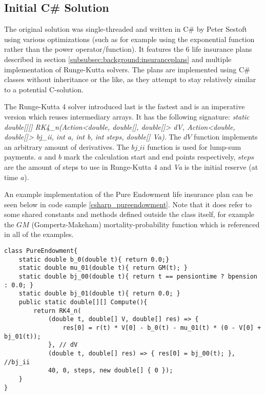 \subsection{Initial C\# Solution}
The original solution was single-threaded and written in C\# by Peter Sestoft using various optimizations (such as for example using the exponential function rather than the power operator/function).
It features the 6 life insurance plans described in section \ref{subsubsec:background:insuranceplans} and multiple implementation of Runge-Kutta solvers.
The plans are implemented using C\# classes without inheritance or the like, as they attempt to stay relatively similar to a potential C-solution.

The Runge-Kutta 4 solver introduced last is the fastest and is an imperative version which reuses intermediary arrays.
It has the following signature: \textit{static double[][] RK4\_n(Action\textless{}double, double[], double[]\textgreater{} dV, Action\textless{}double, double[]\textgreater{} bj\_ii, int a, int b, int steps, double[] Va)}.
The $dV$ function implements an arbitrary amount of derivatives.
The $bj\_ii$ function is used for lump-sum payments.
$a$ and $b$ mark the calculation start and end points respectively, $steps$ are the amount of steps to use in Runge-Kutta 4 and \textit{Va} is the initial reserve (at time $a$).

An example implementation of the Pure Endowment life insurance plan can be seen below in code sample \ref{csharp_pureendowment}. 
Note that it does refer to some shared constants and methods defined outside the class itself, for example the $GM$ (Gompertz-Makeham) mortality-probability function which is referenced in all of the examples.
\clearpage
\begin{lstlisting}[language=CSharp, caption=The pure endowment insurance plan expressed in C\#, label=csharp_pureendowment]
class PureEndowment{
    static double b_0(double t){ return 0.0;}
    static double mu_01(double t){ return GM(t); }
    static double bj_00(double t){ return t == pensiontime ? bpension : 0.0; }
    static double bj_01(double t){ return 0.0; }
    public static double[][] Compute(){
        return RK4_n(
            (double t, double[] V, double[] res) => { 
                res[0] = r(t) * V[0] - b_0(t) - mu_01(t) * (0 - V[0] + bj_01(t)); 
            }, // dV
            (double t, double[] res) => { res[0] = bj_00(t); }, //bj_ii
            40, 0, steps, new double[] { 0 });
    }
}
\end{lstlisting}

